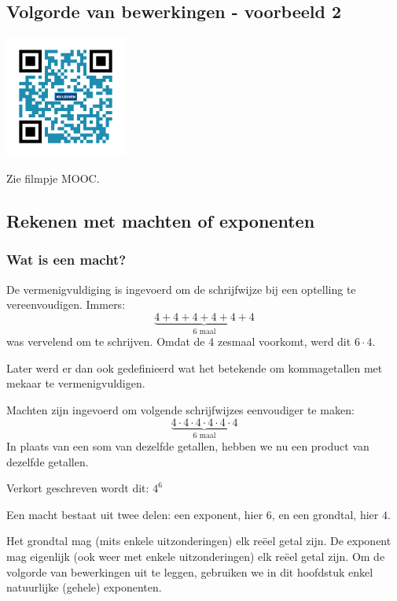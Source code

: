 \subsection{Volgorde van bewerkingen - voorbeeld 2}
\begin{minipage}{.25\linewidth}
	\raggedright
	\includegraphics[width=4cm]{1_elem_rekenvaardigheden_A/inputs/QR_Code_VOLGORDE2_module1}
\end{minipage}
\begin{minipage}{.7\linewidth}
	Zie filmpje MOOC.
\end{minipage}

\subsection{Rekenen met machten of exponenten}
\subsubsection{Wat is een macht?}
De vermenigvuldiging is ingevoerd om de schrijfwijze bij een optelling te vereenvoudigen. Immers:
\begin{equation*}
\underbrace{4+4+4+4+4+4}_{\text{6 maal}}
\end{equation*}
was vervelend om te schrijven. Omdat de 4 zesmaal voorkomt, werd dit $6 \cdot 4$.

Later werd er dan ook gedefinieerd wat het betekende om kommagetallen met mekaar te vermenigvuldigen.

Machten zijn ingevoerd om volgende schrijfwijzes eenvoudiger te maken:
\begin{equation*}
\underbrace{4 \cdot 4\cdot4\cdot4\cdot4\cdot4}_{\text{6 maal}}
\end{equation*}
In plaats van een som van dezelfde getallen, hebben we nu een product van dezelfde getallen.

Verkort geschreven wordt dit: $4^6$

Een macht bestaat uit twee delen: een exponent, hier $6$, en een grondtal, hier $4$.

Het grondtal mag (mits enkele uitzonderingen) elk re\"eel getal zijn. De exponent mag eigenlijk (ook weer met enkele uitzonderingen) elk re\"eel getal zijn. Om de volgorde van bewerkingen uit te leggen, gebruiken we in dit hoofdstuk enkel natuurlijke (gehele) exponenten.

